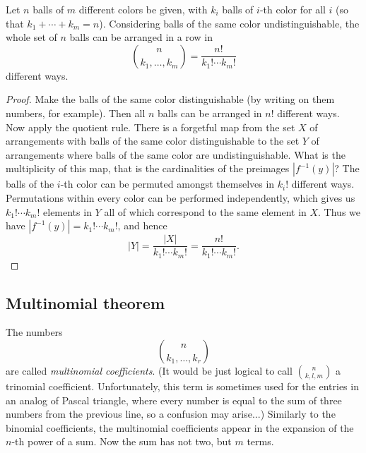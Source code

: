 \begin{page}
\setcounter{section}{4}
\setcounter{subsection}{1}
\setcounter{dfn}{1}
\label{portion:134}

\begin{thm}
Let $n$ balls of $m$ different colors be given, with $k_i$ balls of $i$-th color for all $i$ (so that $k_1 + \cdots + k_m = n$).
Considering balls of the same color undistinguishable, the whole set of $n$ balls can be arranged in a row in
\[
\binom{n}{k_1, \ldots, k_m} = \frac{n!}{k_1! \cdots k_m!}
\]
different ways.
\end{thm}

\end{page}

\begin{page}
\setcounter{section}{4}
\setcounter{subsection}{2}
\setcounter{dfn}{1}
\label{portion:135}

\begin{proof}
Make the balls of the same color distinguishable (by writing on them numbers, for example).
Then all $n$ balls can be arranged in $n!$ different ways.
Now apply the quotient rule.
There is a forgetful map from the set $X$ of arrangements with balls of the same color distinguishable
to the set $Y$ of arrangements where balls of the same color are undistinguishable.
What is the multiplicity of this map, that is the cardinalities of the preimages $|f^{-1}(y)|$?
The balls of the $i$-th color can be permuted amongst themselves in $k_i!$ different ways.
Permutations within every color can be performed independently, which gives us $k_1! \cdots k_m!$ elements in $Y$
all of which correspond to the same element in $X$.
Thus we have $|f^{-1}(y)| = k_1! \cdots k_m!$, and hence
\[
|Y| = \frac{|X|}{k_1! \cdots k_m!} = \frac{n!}{k_1! \cdots k_m!}.
\]
\end{proof}




\end{page}

\begin{page}
\setcounter{section}{4}
\setcounter{subsection}{2}
\setcounter{dfn}{1}
\label{portion:137}

\subsection{Multinomial theorem}
The numbers
\[
\binom{n}{k_1, \ldots, k_r}
\]
are called \emph{multinomial coefficients}.
(It would be just logical to call $\binom{n}{k, l, m}$ a trinomial coefficient.
Unfortunately, this term is sometimes used for the entries in an analog of Pascal triangle,
where every number is equal to the sum of three numbers from the previous line, so a confusion may arise...)
Similarly to the binomial coefficients, the multinomial coefficients appear in the expansion of the $n$-th power of a sum.
Now the sum has not two, but $m$ terms.


\end{page}

